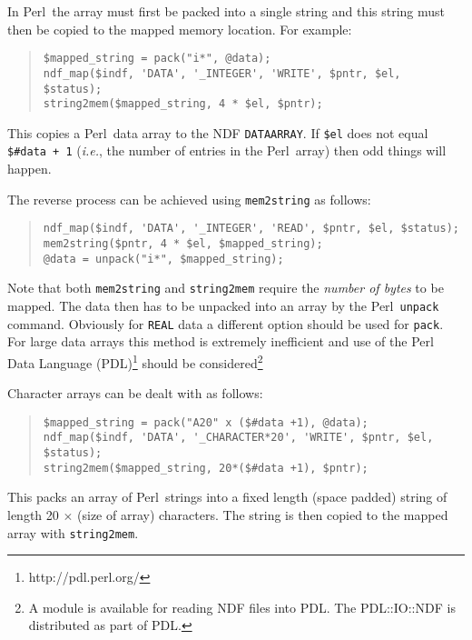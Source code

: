 \documentclass[twoside,11pt]{article}
\newenvironment{myquote}{\begin{quote}\begin{small}}{\end{small}\end{quote}}
\newcommand{\perl}{\xref{\textsf{Perl}}{sun193}{}}
\newcommand{\htmladdnormallinkfoot}[2]{#1\footnote{#2}}
\newcommand{\xref}[3]{#1}
\renewcommand{\_}{\texttt{\symbol{95}}}
\begin{document}
In \perl\ the array must first be packed into a single string and this
string must then be copied to the mapped memory location.
For example:

\begin{myquote}
\begin{verbatim}
$mapped_string = pack("i*", @data);
ndf_map($indf, 'DATA', '_INTEGER', 'WRITE', $pntr, $el, $status);
string2mem($mapped_string, 4 * $el, $pntr);
\end{verbatim}
\end{myquote}

This copies a \perl\ data array to the NDF \texttt{DATA\_ARRAY}. If
\texttt{\$el} does not equal \texttt{\$\#data + 1} (\emph{i.e.}, the
number of entries in the \perl\ array) then odd things will happen.

The reverse process can be achieved using \texttt{mem2string} as follows:

\begin{myquote}
\begin{verbatim}
ndf_map($indf, 'DATA', '_INTEGER', 'READ', $pntr, $el, $status);
mem2string($pntr, 4 * $el, $mapped_string);
@data = unpack("i*", $mapped_string);
\end{verbatim}
\end{myquote}

Note that both \texttt{mem2string} and \texttt{string2mem} require the
\emph{number of bytes\/} to be mapped.  The data then has to be
unpacked into an array by the \perl\ \texttt{unpack} command. Obviously
for \texttt{\_REAL} data a different option should be used for
\texttt{pack}.  For large data arrays this method is extremely
inefficient and use of the \htmladdnormallinkfoot{Perl Data Language
(PDL)}{http://pdl.perl.org/} should be
considered\footnote{A module is available for reading NDF files into
PDL. The PDL::IO::NDF is distributed as part of PDL.}

Character arrays can be dealt with as follows:

\begin{myquote}
\begin{verbatim}
$mapped_string = pack("A20" x ($#data +1), @data);
ndf_map($indf, 'DATA', '_CHARACTER*20', 'WRITE', $pntr, $el, $status);
string2mem($mapped_string, 20*($#data +1), $pntr);
\end{verbatim}
\end{myquote}

This packs an array of \perl\ strings into a fixed length (space padded) string
of length 20 $\times$ (size of array) characters. The string is then copied to
the mapped array with \texttt{string2mem}.
\end{document}
